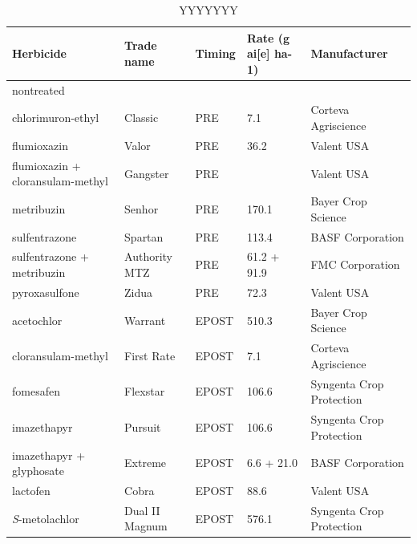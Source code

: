 \documentclass[agriculture,article,submit,moreauthors,pdftex]{mdpi}
\begin{document}
\begin{table}[]
\caption{YYYYYYY}
\label{tab:my-table}
\begin{tabular}{@{}lllll@{}}
\toprule
\textbf{Herbicide}               & \textbf{Trade name}     & \textbf{Timing}         & \textbf{Rate (g ai{[}e{]} ha-1)} & \textbf{Manufacturer}             \\ \midrule
nontreated                       &                &        &                         &                          \\
chlorimuron-ethyl                & Classic        & PRE    & 7.1                     & Corteva Agriscience      \\
flumioxazin                      & Valor          & PRE    & 36.2                    & Valent USA               \\
flumioxazin + cloransulam-methyl & Gangster       & PRE    &                         & Valent USA               \\
metribuzin                       & Senhor         & PRE    & 170.1                   & Bayer Crop Science       \\
sulfentrazone                    & Spartan        & PRE    & 113.4                   & BASF Corporation         \\
sulfentrazone + metribuzin       & Authority MTZ  & PRE    & 61.2 + 91.9             & FMC Corporation          \\
pyroxasulfone                    & Zidua          & PRE    & 72.3                    & Valent USA               \\
acetochlor                       & Warrant        & EPOST  & 510.3                   & Bayer Crop Science       \\
cloransulam-methyl               & First Rate     & EPOST  & 7.1                     & Corteva Agriscience      \\
fomesafen                        & Flexstar       & EPOST  & 106.6                   & Syngenta Crop Protection \\
imazethapyr                      & Pursuit        & EPOST  & 106.6                   & Syngenta Crop Protection \\
imazethapyr + glyphosate         & Extreme        & EPOST  & 6.6 + 21.0              & BASF Corporation         \\
lactofen                         & Cobra          & EPOST  & 88.6                    & Valent USA               \\
\textit{S}-metolachlor                    & Dual II Magnum & EPOST  & 576.1          & Syngenta Crop Protection \\ \bottomrule
\end{tabular}
\end{table}
\end{document}
